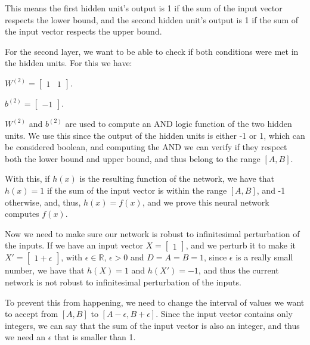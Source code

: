 \documentclass{article}
\begin{document}
This means the first hidden unit's output is 1 if the sum of the input vector respects the lower bound, 
and the second hidden unit's output is 1 if the sum of the input vector respects the upper bound.

For the second layer, we want to be able to check if both conditions were met in the hidden units. For this we have:

\bigskip

\( W^{(2)} = \begin{bmatrix}
    1 & 1
\end{bmatrix}
\).

\medskip

\(b^{(2)} = \begin{bmatrix}
    -1
\end{bmatrix}
\).

\bigskip

\(W^{(2)}\) and \(b^{(2)}\) are used to compute an AND logic function of the two hidden units. We use this since the output of
the hidden units is either -1 or 1, which can be considered boolean, and computing the AND we can verify if they respect both the 
lower bound and upper bound, and thus belong to the range \([A, B]\). 

With this, if \(h(x)\) is the resulting function of the network, we have that \(h(x) = 1\) if the sum of the input vector is within the range \([A, B]\),
and -1 otherwise, and, thus, \(h(x) = f(x)\), and we prove this neural network computes \(f(x)\).

\bigskip

Now we need to make sure our network is robust to infinitesimal perturbation of the inputs.
If we have an input vector $X = \begin{bmatrix}
    1
\end{bmatrix}
$, and we perturb it to make it $X' = \begin{bmatrix}
    1 + \epsilon
\end{bmatrix}
$, with $\epsilon \in \mathbb{R}$, $\epsilon > 0$ and $D = A = B = 1$, since $\epsilon$ is a really small number, 
we have that $h(X) = 1$ and $h(X') = -1$, and thus the current network is not robust to infinitesimal perturbation of the inputs.

\bigskip

To prevent this from happening, we need to change the interval of values we want to accept from $[A, B]$ to $[A - \epsilon, B + \epsilon]$.
Since the input vector contains only integers, we can say that
the sum of the input vector is also an integer, and thus we need an $\epsilon$ that is smaller than 1. 
\end{document}
